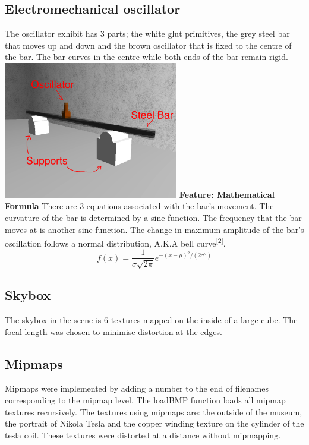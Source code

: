 \documentclass[10pt, oneside]{article}   	%
\begin{document}
\newpage
\subsection{Electromechanical oscillator}
The oscillator exhibit has 3 parts; the white glut primitives, the grey steel bar that moves up and down and the brown oscillator that is fixed to the centre of the bar.  The bar curves in the centre while both ends of the bar remain rigid.
\vspace{2mm}
\newline
\includegraphics[height=6cm]{oscillator.png}
\newline
\newline
\textbf{Feature: Mathematical Formula}\hspace{3mm} There are 3 equations associated with the bar's movement.  The curvature of the bar is determined by a sine function.  The frequency that the bar moves at is another sine function.  The change in maximum amplitude of the bar's oscillation follows a normal distribution, A.K.A bell curve\textsuperscript{[2]}.
\begin{equation}
f(x) = \frac{1}{\sigma\sqrt{2\pi}} e^{-(x - \mu)^{2}/(2\sigma^{2}) }
\end{equation}

\subsection{Skybox}
The skybox in the scene is 6 textures mapped on the inside of a large cube.  The focal length was chosen to minimise distortion at the edges.

\subsection{Mipmaps}
Mipmaps were implemented by adding a number to the end of filenames corresponding to the mipmap level.  The loadBMP function loads all mipmap textures recursively.  The textures using mipmaps are: the outside of the museum, the portrait of Nikola Tesla and the copper winding texture on the cylinder of the tesla coil.  These textures were distorted at a distance without mipmapping.
\newline
\newline
\end{document}
